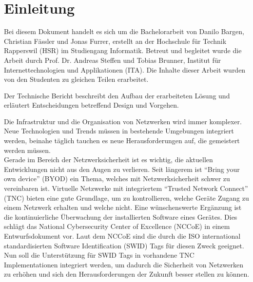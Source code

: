 \chapter{Einleitung}


Bei diesem Dokument handelt es sich um die Bachelorarbeit von Danilo Bargen,
Christian Fässler und Jonas Furrer, erstellt an der Hochschule für Technik
Rapperswil (HSR) im Studiengang Informatik. Betreut und begleitet wurde die
Arbeit durch Prof. Dr. Andreas Steffen und Tobias Brunner, Institut für
Internettechnologien und Applikationen (ITA). Die Inhalte dieser Arbeit wurden
von den Studenten zu gleichen Teilen erarbeitet.


Der Technische Bericht beschreibt den Aufbau der erarbeiteten Lösung und
erläutert Entscheidungen betreffend Design und Vorgehen.


Die Infrastruktur und die Organisation von Netzwerken wird immer komplexer. Neue
Technologien und Trends müssen in bestehende Umgebungen integriert werden,
beinahe täglich tauchen es neue Herausforderungen auf, die gemeistert werden
müssen. \\ Gerade im Bereich der Netzwerksicherheit ist es wichtig, die
aktuellen Entwicklungen nicht aus den Augen zu verlieren. Seit längerem ist
\enquote{Bring your own device} (BYOD) ein Thema, welches mit Netzwerksicherheit
schwer zu vereinbaren ist. Virtuelle Netzwerke mit integriertem \enquote{Trusted
Network Connect} (TNC) bieten eine gute Grundlage, um zu kontrollieren, welche
Geräte Zugang zu einem Netzwerk erhalten und welche nicht. Eine wünschenswerte
Ergänzung ist die kontinuierliche Überwachung der installierten Software eines
Gerätes. Dies schlägt das National Cybersecurity Center of Excellence (NCCoE) in
einem Entwurfsdokument vor. Laut dem NCCoE sind die durch die ISO international
standardisierten Software Identification (SWID) Tags für diesen Zweck geeignet.
\\ Nun soll die Unterstützung für SWID Tags in vorhandene TNC Implementationen
integriert werden, um dadurch die Sicherheit von Netzwerken zu erhöhen und sich
den Herausforderungen der Zukunft besser stellen zu können.
